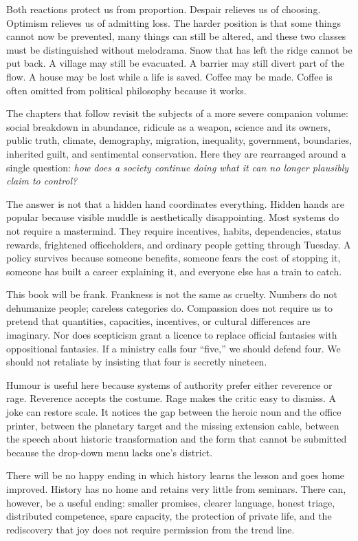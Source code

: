 \documentclass[12pt,a4paper]{book}
\begin{document}
Both reactions protect us from proportion.  Despair relieves us of choosing.
Optimism relieves us of admitting loss.  The harder position is that some
things cannot now be prevented, many things can still be altered, and these
two classes must be distinguished without melodrama.  Snow that has left the
ridge cannot be put back.  A village may still be evacuated.  A barrier may
still divert part of the flow.  A house may be lost while a life is saved.
Coffee may be made.  Coffee is often omitted from political philosophy because
it works.

The chapters that follow revisit the subjects of a more severe companion
volume: social breakdown in abundance, ridicule as a weapon, science and its
owners, public truth, climate, demography, migration, inequality, government,
boundaries, inherited guilt, and sentimental conservation.  Here they are
rearranged around a single question: \emph{how does a society continue doing
what it can no longer plausibly claim to control?}

The answer is not that a hidden hand coordinates everything.  Hidden hands are
popular because visible muddle is aesthetically disappointing.  Most systems
do not require a mastermind.  They require incentives, habits, dependencies,
status rewards, frightened officeholders, and ordinary people getting through
Tuesday.  A policy survives because someone benefits, someone fears the cost
of stopping it, someone has built a career explaining it, and everyone else
has a train to catch.

This book will be frank.  Frankness is not the same as cruelty.  Numbers do not
dehumanize people; careless categories do.  Compassion does not require us to
pretend that quantities, capacities, incentives, or cultural differences are
imaginary.  Nor does scepticism grant a licence to replace official fantasies
with oppositional fantasies.  If a ministry calls four ``five,'' we should
defend four.  We should not retaliate by insisting that four is secretly
nineteen.

Humour is useful here because systems of authority prefer either reverence or
rage.  Reverence accepts the costume.  Rage makes the critic easy to dismiss.
A joke can restore scale.  It notices the gap between the heroic noun and the
office printer, between the planetary target and the missing extension cable,
between the speech about historic transformation and the form that cannot be
submitted because the drop-down menu lacks one's district.

There will be no happy ending in which history learns the lesson and goes home
improved.  History has no home and retains very little from seminars.  There
can, however, be a useful ending: smaller promises, clearer language, honest
triage, distributed competence, spare capacity, the protection of private
life, and the rediscovery that joy does not require permission from the trend
line.
\end{document}

